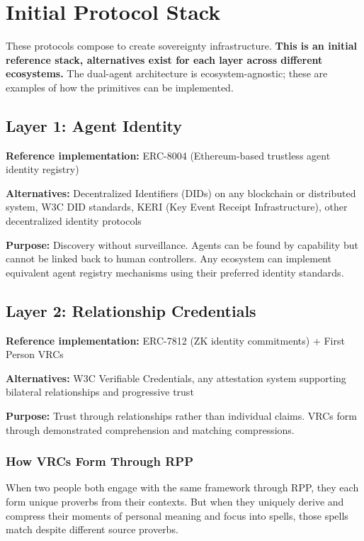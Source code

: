 \documentclass[11pt,a4paper]{article}
\theoremstyle{definition}
\begin{document}
\section{Initial Protocol Stack}

These protocols compose to create sovereignty infrastructure. \textbf{This is an initial reference stack, alternatives exist for each layer across different ecosystems.} The dual-agent architecture is ecosystem-agnostic; these are examples of how the primitives can be implemented.

\subsection{Layer 1: Agent Identity}

\textbf{Reference implementation:} ERC-8004 (Ethereum-based trustless agent identity registry)

\textbf{Alternatives:} Decentralized Identifiers (DIDs) on any blockchain or distributed system, W3C DID standards, KERI (Key Event Receipt Infrastructure), other decentralized identity protocols

\textbf{Purpose:} Discovery without surveillance. Agents can be found by capability but cannot be linked back to human controllers. Any ecosystem can implement equivalent agent registry mechanisms using their preferred identity standards.

\subsection{Layer 2: Relationship Credentials}

\textbf{Reference implementation:} ERC-7812 (ZK identity commitments) + First Person VRCs

\textbf{Alternatives:} W3C Verifiable Credentials, any attestation system supporting bilateral relationships and progressive trust

\textbf{Purpose:} Trust through relationships rather than individual claims. VRCs form through demonstrated comprehension and matching compressions.

\subsubsection{How VRCs Form Through RPP}

When two people both engage with the same framework through RPP, they each form unique proverbs from their contexts. But when they uniquely derive and compress their moments of personal meaning and focus into spells, those spells match despite different source proverbs.
\end{document}
